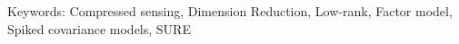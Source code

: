 \documentclass[11pt,oneside]{amsart}
\begin{document}
\begin{abstract}
\end{abstract}

Keywords: Compressed sensing, Dimension Reduction, Low-rank, Factor model, Spiked covariance models, SURE%





\end{document}
